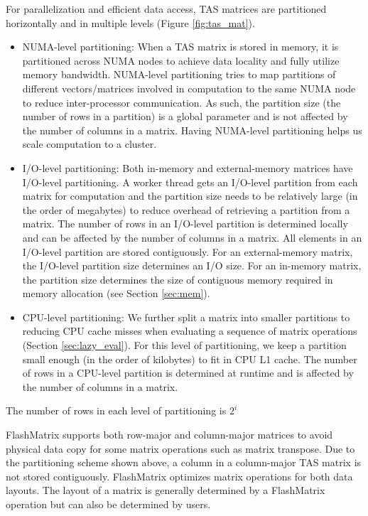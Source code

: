 For parallelization and efficient data access, TAS matrices are partitioned
horizontally and in multiple levels (Figure \ref{fig:tas_mat}).
\begin{itemize}
\item NUMA-level partitioning: When a TAS
matrix is stored in memory, it is partitioned across NUMA nodes to achieve
data locality and fully utilize memory bandwidth. NUMA-level partitioning
tries to map partitions of different vectors/matrices involved in computation
to the same NUMA node to reduce inter-processor communication. As such,
the partition size (the number of rows in a partition) is a global parameter
and is not affected by the number of columns in a matrix. Having NUMA-level
partitioning helps us scale computation to a cluster.
\item I/O-level partitioning: Both in-memory and external-memory matrices have
I/O-level partitioning. A worker thread gets an I/O-level partition from each
matrix for computation and the partition size needs to be relatively large
(in the order of megabytes) to reduce overhead of retrieving a partition from
a matrix. The number of rows in an I/O-level partition is determined locally
and can be affected by the number of columns in a matrix.
All elements in an I/O-level partition are stored contiguously.
For an external-memory matrix, the I/O-level partition size determines an I/O
size. For an in-memory matrix, the partition size determines the size of
contiguous memory required in memory allocation (see Section \ref{sec:mem}).
\item CPU-level partitioning: We further split a matrix into smaller partitions
to reducing CPU cache misses when evaluating a sequence of matrix operations
(Section \ref{sec:lazy_eval}). For this level of partitioning, we keep
a partition small enough (in the order of kilobytes) to fit in CPU L1 cache.
The number of rows in a CPU-level partition is determined at runtime and
is affected by the number of columns in a matrix.
\end{itemize}
The number of rows in each level of partitioning is $2^i$

FlashMatrix supports both row-major and column-major matrices to avoid physical
data copy for some matrix operations such as matrix transpose. Due to
the partitioning scheme shown above, a column in a column-major TAS matrix
is not stored contiguously. FlashMatrix optimizes matrix operations for both
data layouts. The layout of a matrix is generally
determined by a FlashMatrix operation but can also be determined by users. 

